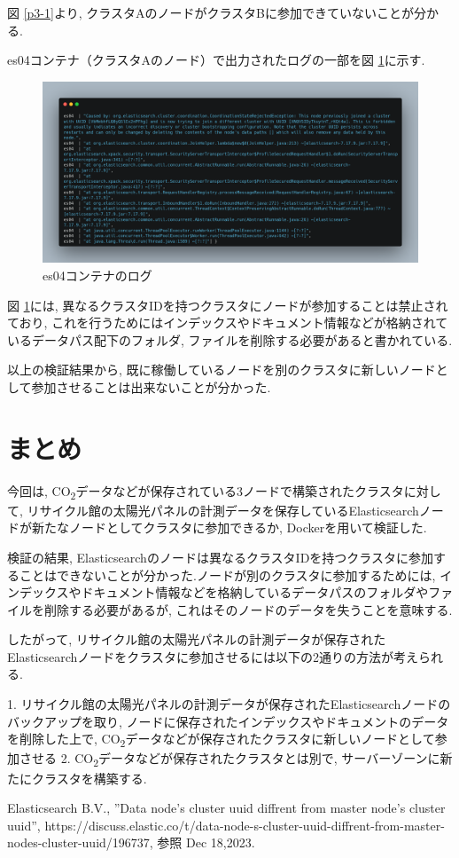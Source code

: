 \documentclass[a4j,12pt,]{jarticle}
\begin{document}
図 \ref{p3-1}より, クラスタAのノードがクラスタBに参加できていないことが分かる.

es04コンテナ（クラスタAのノード）で出力されたログの一部を図 \ref{p3-2}に示す.

\begin{figure}[H]
  \begin{center}
    \includegraphics[width=160mm]{es04-log.png}
    \caption{es04コンテナのログ}
    \label{p3-2}
  \end{center}
\end{figure}

図 \ref{p3-2}には, 異なるクラスタIDを持つクラスタにノードが参加することは禁止されており, これを行うためにはインデックスやドキュメント情報などが格納されているデータパス配下のフォルダ, ファイルを削除する必要があると書かれている.

以上の検証結果から, 既に稼働しているノードを別のクラスタに新しいノードとして参加させることは出来ないことが分かった.

\section{まとめ}
今回は, CO\textsubscript{2}データなどが保存されている3ノードで構築されたクラスタに対して, リサイクル館の太陽光パネルの計測データを保存しているElasticsearchノードが新たなノードとしてクラスタに参加できるか, Dockerを用いて検証した.

検証の結果, Elasticsearchのノードは異なるクラスタIDを持つクラスタに参加することはできないことが分かった.ノードが別のクラスタに参加するためには, インデックスやドキュメント情報などを格納しているデータパスのフォルダやファイルを削除する必要があるが, これはそのノードのデータを失うことを意味する.

したがって, リサイクル館の太陽光パネルの計測データが保存されたElasticsearchノードをクラスタに参加させるには以下の2通りの方法が考えられる.

1. リサイクル館の太陽光パネルの計測データが保存されたElasticsearchノードのバックアップを取り, ノードに保存されたインデックスやドキュメントのデータを削除した上で, CO\textsubscript{2}データなどが保存されたクラスタに新しいノードとして参加させる
2. CO\textsubscript{2}データなどが保存されたクラスタとは別で, サーバーゾーンに新たにクラスタを構築する.

\begin{thebibliography}{5}
  Elasticsearch B.V., ”Data node's cluster uuid diffrent from master node's cluster uuid”, https://discuss.elastic.co/t/data-node-s-cluster-uuid-diffrent-from-master-nodes-cluster-uuid/196737, 参照 Dec 18,2023.
\end{thebibliography}
\end{document}
